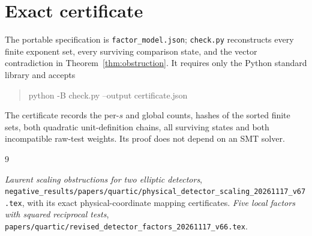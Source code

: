 \documentclass[11pt,a4paper]{article}
\begin{document}
\section{Exact certificate}\label{sec:certificate}

The portable specification is \texttt{factor\_model.json};
\texttt{check.py} reconstructs every finite exponent set, every
surviving comparison state, and the vector contradiction in
Theorem~\ref{thm:obstruction}. It requires only the Python standard
library and accepts
\begin{quote}\ttfamily
python -B check.py --output certificate.json
\end{quote}
The certificate records the per-$s$ and global counts, hashes of the
sorted finite sets, both quadratic unit-definition chains, all
surviving states and both incompatible raw-test weights. Its proof
does not depend on an SMT solver.

\begin{thebibliography}{9}\raggedright
{}
\emph{Laurent scaling obstructions for two elliptic detectors},
\nolinkurl{negative_results/papers/quartic/physical_detector_scaling_20261117_v67.tex},
with its exact physical-coordinate mapping certificates.
\emph{Five local factors with squared reciprocal tests},
\nolinkurl{papers/quartic/revised_detector_factors_20261117_v66.tex}.
\end{thebibliography}
\end{document}
